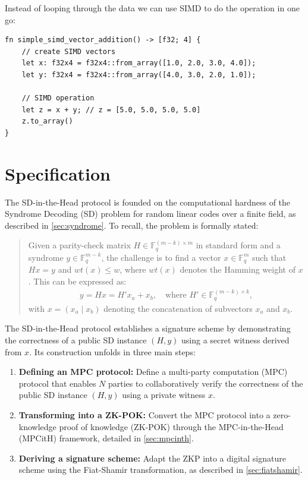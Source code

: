 \documentclass[11pt]{report}
\theoremstyle{definition}
\theoremstyle{plain}
\begin{document}
Instead of looping through the data we can use SIMD to do the operation in one go:

\begin{verbatim}
fn simple_simd_vector_addition() -> [f32; 4] {
    // create SIMD vectors
    let x: f32x4 = f32x4::from_array([1.0, 2.0, 3.0, 4.0]);
    let y: f32x4 = f32x4::from_array([4.0, 3.0, 2.0, 1.0]);

    // SIMD operation
    let z = x + y; // z = [5.0, 5.0, 5.0, 5.0]
    z.to_array() 
}
\end{verbatim}

\chapter{Specification}\label{ch:spec}

The SD-in-the-Head protocol is founded on the computational hardness of the Syndrome Decoding (SD) problem for random linear codes over a finite field, as described in \autoref{sec:syndrome}. To recall, the problem is formally stated:
\begin{quote}
  Given a parity-check matrix $H \in \mathbb{F}_q^{(m-k) \times m}$ in standard form and a syndrome $y \in \mathbb{F}_q^{m-k}$, the challenge is to find a vector $x \in \mathbb{F}_q^m$ such that $Hx = y$ and $wt(x) \leq w$, where $wt(x)$ denotes the Hamming weight of $x$. This can be expressed as:
  \begin{align*}
    y = Hx = H'x_a + x_b, \quad \text{where } H' \in \mathbb{F}_q^{(m-k) \times k},
  \end{align*}
  with $x = (x_a \mid x_b)$ denoting the concatenation of subvectors $x_a$ and $x_b$.
\end{quote}

The SD-in-the-Head protocol establishes a signature scheme by demonstrating the correctness of a public SD instance $(H, y)$ using a secret witness derived from $x$. Its construction unfolds in three main steps:
\begin{enumerate}
  \item \textbf{Defining an MPC protocol:} Define a multi-party computation (MPC) protocol that enables $N$ parties to collaboratively verify the correctness of the public SD instance $(H, y)$ using a private witness $x$.
  \item \textbf{Transforming into a ZK-POK:} Convert the MPC protocol into a zero-knowledge proof of knowledge (ZK-POK) through the MPC-in-the-Head (MPCitH) framework, detailed in \autoref{sec:mpcinth}.
  \item \textbf{Deriving a signature scheme:} Adapt the ZKP into a digital signature scheme using the Fiat-Shamir transformation, as described in \autoref{sec:fiatshamir}.
\end{enumerate}
\end{document}
